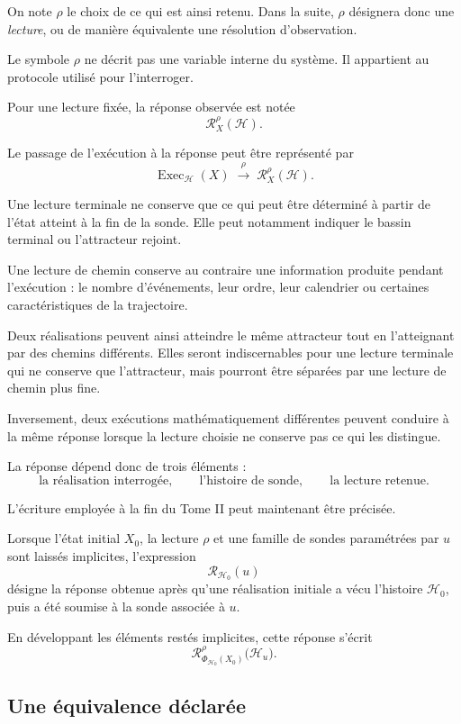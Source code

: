 On note $\rho$ le choix de ce qui est ainsi retenu. Dans la suite, $\rho$ désignera donc une \emph{lecture}, ou de manière équivalente une résolution d'observation.

Le symbole $\rho$ ne décrit pas une variable interne du système. Il appartient au protocole utilisé pour l'interroger.

Pour une lecture fixée, la réponse observée est notée
\[
\mathcal R_X^\rho(\mathcal H).
\]

Le passage de l'exécution à la réponse peut être représenté par
\[
\operatorname{Exec}_{\mathcal H}(X)
\;\xrightarrow{\;\rho\;}\;
\mathcal R_X^\rho(\mathcal H).
\]

Une lecture terminale ne conserve que ce qui peut être déterminé à partir de l'état atteint à la fin de la sonde. Elle peut notamment indiquer le bassin terminal ou l'attracteur rejoint.

Une lecture de chemin conserve au contraire une information produite pendant l'exécution : le nombre d'événements, leur ordre, leur calendrier ou certaines caractéristiques de la trajectoire.

Deux réalisations peuvent ainsi atteindre le même attracteur tout en l'atteignant par des chemins différents. Elles seront indiscernables pour une lecture terminale qui ne conserve que l'attracteur, mais pourront être séparées par une lecture de chemin plus fine.

Inversement, deux exécutions mathématiquement différentes peuvent conduire à la même réponse lorsque la lecture choisie ne conserve pas ce qui les distingue.

La réponse dépend donc de trois éléments :
\[
\text{la réalisation interrogée},
\qquad
\text{l'histoire de sonde},
\qquad
\text{la lecture retenue}.
\]

L'écriture employée à la fin du Tome II peut maintenant être précisée.

Lorsque l'état initial $X_0$, la lecture $\rho$ et une famille de sondes paramétrées par $u$ sont laissés implicites, l'expression
\[
\mathcal R_{\mathcal H_0}(u)
\]
désigne la réponse obtenue après qu'une réalisation initiale a vécu l'histoire $\mathcal H_0$, puis a été soumise à la sonde associée à $u$.

En développant les éléments restés implicites, cette réponse s'écrit
\[
\mathcal R_{\Phi_{\mathcal H_0}(X_0)}^\rho
\bigl(\mathcal H_u\bigr).
\]
\subsection{Une équivalence déclarée}
\label{t3-equivalence-declaree}

